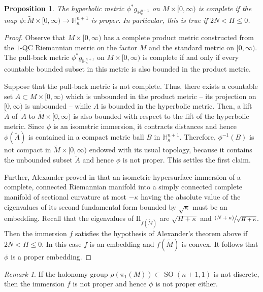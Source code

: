 \documentclass[10pt]{amsart}
\DeclareMathOperator{\SO}{SO}
\newcommand{\II}{\mathrm{II}}
\newcommand{\psfrac}[2]{\sfrac{(#1)}{#2}}
\newtheorem{proposition}[theorem]{Proposition}
\theoremstyle{definition}
\theoremstyle{remark}
\newtheorem{remark}[theorem]{Remark}
\numberwithin{equation}{section}
\begin{document}
\begin{proposition}\label{completemetric}
The hyperbolic metric $\phi^*g_{\mathbb H_{\kappa}^{n+1}}$ on $M\times [0,\infty)$ is complete
if the map $\phi: \widetilde{M}\times [0,\infty) \to \mathbb H_{\kappa}^{n+1}$ is proper.
In particular, this is true if $2N < H \leq 0$.
\end{proposition}
\begin{proof}
Observe that $M\times [0,\infty)$ has a complete product metric constructed from the $1$-QC Riemannian metric on the factor $M$ and the standard metric on $[0,\infty)$. The pull-back metric $\phi^*g_{\mathbb H_{\kappa}^{n+1}}$ on $M\times [0,\infty)$ is complete if and only if every countable bounded subset in this metric is also bounded in the product metric.

Suppose that the pull-back metric is not complete. Thus, there exists a countable set $A\subset M\times [0,\infty)$
which is unbounded in the product metric -- \ie its projection on $[0,\infty)$ is unbounded -- while $A$ is bounded in the hyperbolic metric. Then, a lift~$\widetilde{A}$ of~$A$ to $\widetilde{M}\times [0,\infty)$ is also bounded with respect
to the lift of the hyperbolic metric. Since $\phi$ is an isometric immersion, it contracts distances and hence
$\phi(\widetilde{A})$ is contained in a compact metric ball $B$ in
$\mathbb H_{\kappa}^{n+1}$. Therefore, $\phi^{-1}(B)$ is not compact
in $\widetilde{M}\times [0,\infty)$ endowed with its usual topology, because it contains the unbounded subset
$\widetilde{A}$ and hence $\phi$ is not proper. This settles the first claim.

Further, Alexander proved in \cite[Prop.\,2]{Al} that an isometric hypersurface immersion of a complete, connected
Riemannian manifold into a simply connected complete manifold of sectional curvature at most $-\kappa$ having
the absolute value of the eigenvalues of its second fundamental form bounded by $\sqrt{\kappa}$ must be
an embedding. Recall that the eigenvalues of $\II_{f(\widetilde{M})}$ are $\sqrt{H+\kappa}$ and $\psfrac{N+\kappa}{\sqrt{H+\kappa}}$. Then the immersion $f$ satisfies the hypothesis of Alexander's theorem above if
$2N < H \leq 0$. In this case $f$ is an embedding and $f(\widetilde{M})$ is convex. It follows that
$\phi$ is a proper embedding.
\end{proof}

\begin{remark}
If the holonomy group $\rho(\pi_1(M))\subset \SO(n+1,1)$ is not discrete, then the immersion $f$ is not proper and
hence $\phi$ is not proper either.
\end{remark}
\end{document}
